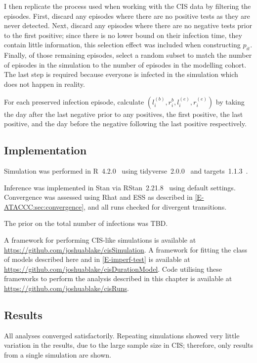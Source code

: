 \documentclass[thesis.tex]{subfiles}
\begin{document}
I then replicate the process used when working with the CIS data by filtering the episodes.
First, discard any episodes where there are no positive tests as they are never detected.
Next, discard any episodes where there are no negative tests prior to the first positive; since there is no lower bound on their infection time, they contain little information, this selection effect was included when constructing $p_{it}$.
Finally, of those remaining episodes, select a random subset to match the number of episodes in the simulation to the number of episodes in the modelling cohort.
The last step is required because everyone is infected in the simulation which does not happen in reality.

For each preserved infection episode, calculate $(l_i^{(b)}, r_i^{b}, l_i^{(e)}, r_i^{(e)})$ by taking the day after the last negative prior to any positives, the first positive, the last positive, and the day before the negative following the last positive respectively.

\subsection{Implementation}

Simulation was performed in R~4.2.0~\autocite{R4-2-0} using tidyverse~2.0.0~\autocite{tidyverse} and targets~1.1.3~\autocite{targetsPackage}.

Inference was implemented in Stan via RStan~2.21.8~\autocite{rstan2-21-8} using default settings.
Convergence was assessed using Rhat and ESS as described in \cref{E-ATACCC:sec:convergence}, and all runs checked for divergent transitions.

The prior on the total number of infections was TBD.

A framework for performing CIS-like simulations is available at \url{https://github.com/joshuablake/cisSimulation}.
A framework for fitting the class of models described here and in \cref{E-imperf-test} is available at \url{https://github.com/joshuablake/cisDurationModel}.
Code utilising these frameworks to perform the analysis described in this chapter is available at \url{https://github.com/joshuablake/cisRuns}.

\subsection{Results}

All analyses converged satisfactorily.
Repeating simulations showed very little variation in the results, due to the large sample size in CIS; therefore, only results from a single simulation are shown.
\end{document}

